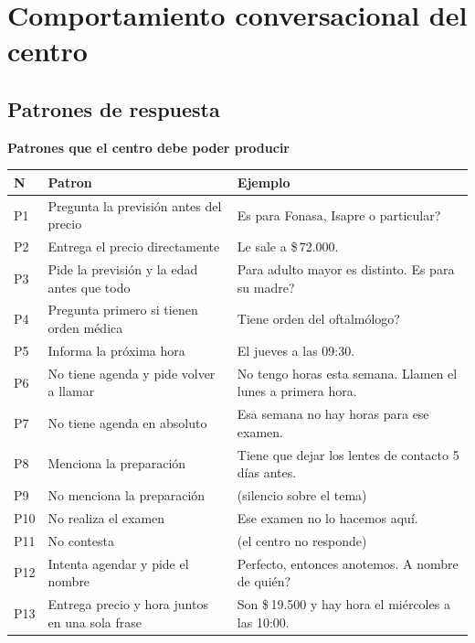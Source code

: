 \documentclass[11pt,a4paper]{article}
\newenvironment{CajaNota}
  {\par\medskip\begin{lrbox}{\boxnota}%
   \begin{minipage}{0.92\textwidth}\small}
  {\end{minipage}\end{lrbox}%
   \noindent\setlength{\fboxsep}{8pt}\setlength{\fboxrule}{0.8pt}%
   \fcolorbox{colazul}{fondoazul}{\usebox{\boxnota}}\par\medskip}
\newcommand{\boxtitle}[1]{\textbf{\color{headcol}#1}\par\vspace{2pt}}
\newcommand{\pesos}[1]{\mbox{\$\,#1}}
\begin{document}
\section{Comportamiento conversacional del centro}

\subsection{Patrones de respuesta}

\begin{CajaNota}
\boxtitle{Patrones que el centro debe poder producir}

\begin{center}
\small
\begin{tabularx}{\textwidth}{@{}p{0.9cm}p{5.6cm}X@{}}
\toprule
\rowcolor{fondoazul}\textbf{N} & \textbf{Patron} & \textbf{Ejemplo} \\
\midrule
P1 & Pregunta la previsión antes del precio &
  Es para Fonasa, Isapre o particular? \\
P2 & Entrega el precio directamente &
  Le sale a \pesos{72.000}. \\
P3 & Pide la previsión y la edad antes que todo &
  Para adulto mayor es distinto. Es para su madre? \\
P4 & Pregunta primero si tienen orden médica &
  Tiene orden del oftalmólogo? \\
P5 & Informa la próxima hora & El jueves a las 09:30. \\
P6 & No tiene agenda y pide volver a llamar &
  No tengo horas esta semana. Llamen el lunes a primera hora. \\
P7 & No tiene agenda en absoluto &
  Esa semana no hay horas para ese examen. \\
P8 & Menciona la preparación &
  Tiene que dejar los lentes de contacto 5 días antes. \\
P9 & No menciona la preparación &
  (silencio sobre el tema) \\
P10 & No realiza el examen & Ese examen no lo hacemos aquí. \\
P11 & No contesta & (el centro no responde) \\
P12 & Intenta agendar y pide el nombre &
  Perfecto, entonces anotemos. A nombre de quién? \\
P13 & Entrega precio y hora juntos en una sola frase &
  Son \pesos{19.500} y hay hora el miércoles a las 10:00. \\
\bottomrule
\end{tabularx}
\end{center}
\end{CajaNota}
\end{document}
